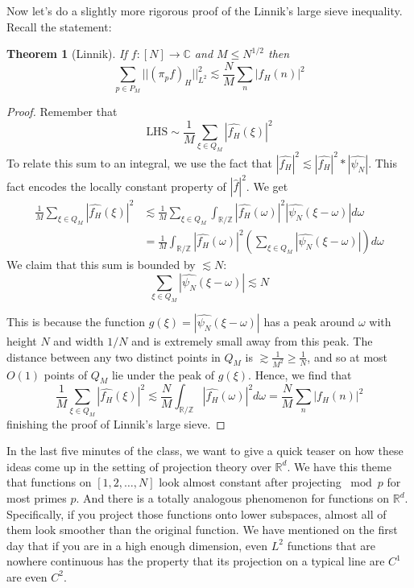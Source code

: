 \documentclass[12pt]{amsart}
\newtheorem{theorem}{Theorem}[section]
\newcommand{\ZZ}{\mathbb{Z}}
\newcommand{\RR}{\mathbb{R}}
\begin{document}
Now let's do a slightly more rigorous proof of the Linnik's large sieve inequality. Recall the statement:
\begin{theorem}[Linnik]
    If $f : [N] \to \mathbb{C}$ and $M \leq N^{1/2}$ then 
    \begin{equation*}
        \sum_{p \in P_M} || (\pi_p f)_H ||_{L^2} ^{2} \lesssim \dfrac{N}{M} \sum_{n} |f_H(n)|^2
    \end{equation*}
\end{theorem}
\begin{proof}
    Remember that
    \begin{equation*}
        \text{LHS} \sim \frac{1}{M} \sum_{\xi \in Q_M} |\widehat{f_H} (\xi)|^2
    \end{equation*}
    To relate this sum to an integral, we use the fact that $|\widehat{f_H}|^2 \lesssim |\widehat{f_H}|^2 * \left| \widehat{\psi_{N}} \right|$. This fact encodes the locally constant property of $|\widehat{f}|^2$. We get
    \begin{align*}
        \frac{1}{M} \sum_{\xi \in Q_M} |\widehat{f_H} (\xi)|^2 
        &\lesssim \frac{1}{M} \sum_{\xi \in Q_M} \int_{\RR / \ZZ} |\widehat{f_H} (\omega)|^2 \left| \widehat{\psi_{N}} (\xi - \omega) \right|  d \omega   \\
        &= \frac{1}{M} \int_{\RR / \ZZ} |\widehat{f_H} (\omega)|^2 \left( \sum_{\xi \in Q_M} | \widehat{\psi_{N}} (\xi - \omega)| \right) d \omega
    \end{align*}
    We claim that this sum is bounded by $\lesssim N$:
    \begin{equation*}
        \sum_{\xi \in Q_M} | \widehat{\psi_N} (\xi - \omega)| \lesssim N
    \end{equation*}
    
    This is because the function $g(\xi) = | \widehat{\psi_N} (\xi - \omega) |$ has a peak around $\omega$ with height $N$ and width $1/N$ and is extremely small away from this peak.  The distance between any two distinct points in $Q_M$ is $\gtrsim \frac{1}{M^2} \geq \frac{1}{N}$,  and so at most $O(1)$ points of $Q_M$ lie under the peak of $g(\xi)$.   Hence, we find that
    \begin{equation*}
        \frac{1}{M} \sum_{\xi \in Q_M} |\widehat{f_H} (\xi)|^2 \lesssim \frac{N}{M} \int_{\RR / \ZZ} |\widehat{f_H} (\omega)|^2 d \omega = \frac{N}{M} \sum_n |f_H (n)|^2
    \end{equation*}
    finishing the proof of Linnik's large sieve.
\end{proof}
In the last five minutes of the class, we want to give a quick teaser on how these ideas come up in the setting of projection theory over $\RR^d$. We have this theme that functions on $[1, 2, \ldots, N]$ look almost constant after projecting $\bmod p$ for most primes $p$. And there is a totally analogous phenomenon for functions on $\RR^d$. Specifically, if you project those functions onto lower subspaces, almost all of them look smoother than the original function. We have mentioned on the first day that if you are in a high enough dimension, even $L^2$ functions that are nowhere continuous has the property that its projection on a typical line are $C^1$ are even $C^2$. \\
\end{document}
